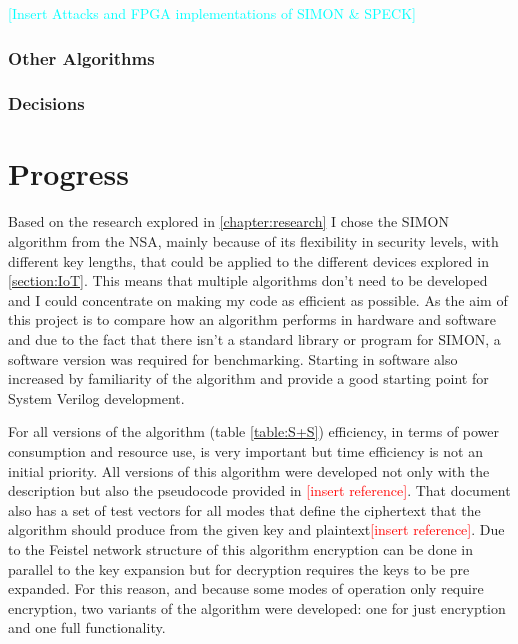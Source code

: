 \documentclass[12pt,twoside,a4paper]{report}
\begin{document}
    \textcolor{cyan}{[Insert Attacks and FPGA implementations of SIMON \& SPECK]}
    
    \subsection{Other Algorithms}
    
    \subsection{Decisions}
    
    \chapter{Progress}
    Based on the research explored in \autoref{chapter:research} I chose the SIMON algorithm from the NSA, mainly because of its flexibility in security levels, with different key lengths, that could be applied to the different devices explored in \autoref{section:IoT}. This means that multiple algorithms don't need to be developed and I could concentrate on making my code as efficient as possible. As the aim of this project is to compare how an algorithm performs in hardware and software and due to the fact that there isn't a standard library or program for SIMON, a software version was required for benchmarking. Starting in software also increased by familiarity of the algorithm and provide a good starting point for System Verilog development.
    
    For all versions of the algorithm (table \ref{table:S+S}) efficiency, in terms of power consumption and resource use, is very important but time efficiency is not an initial priority. All versions of this algorithm were developed not only with the description but also the pseudocode provided in \textcolor{red}{[insert reference]}. That document also has a set of test vectors for all modes that define the ciphertext that the algorithm should produce from the given key and plaintext\textcolor{red}{[insert reference]}. Due to the Feistel network structure of this algorithm encryption can be done in parallel to the key expansion but for decryption requires the keys to be pre expanded. For this reason, and because some modes of operation only require encryption, two variants of the algorithm were developed: one for just encryption and one full functionality.
    
\end{document}
